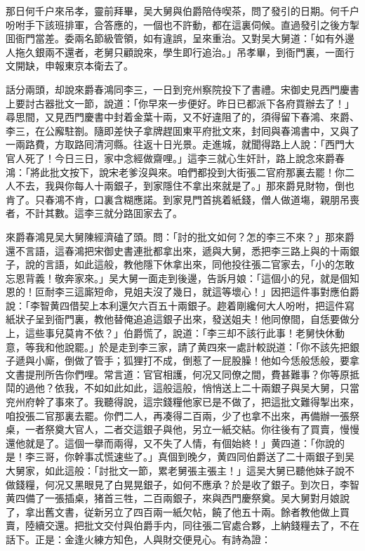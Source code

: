 那日何千户來吊孝，靈前拜畢，吴大舅與伯爵陪侍喫茶，問了發引的日期。何千户吩咐手下該班排軍，合答應的，一個也不許動，都在這裏伺候。直過發引之後方掣囬衙門當差。委兩名節級管領，如有違誤，呈來重治。又對吴大舅道：「如有外邊人拖久銀兩不還者，老舅只顧說來，學生即行追治。」吊孝畢，到衙門裏，一面行文開缺，申報東京本衛去了。

話分兩頭，却說來爵春鴻同李三，一日到兖州察院投下了書禮。宋御史見西門慶書上要討古器批文一節，說道：「你早來一步便好。昨日已都派下各府買辦去了！」尋思間，又見西門慶書中封着金葉十兩，又不好違阻了的，須得留下春鴻、來爵、李三，在公廨駐劄。隨即差快子拿牌趕囬東平府批文來，封囘與春鴻書中，又與了一兩路費，方取路囘清河縣。往返十日光景。走進城，就聞得路上人說：「西門大官人死了！今日三日，家中念經做齋哩。」這李三就心生奸計，路上說念來爵春鴻：「將此批文按下，說宋老爹沒與來。咱們都投到大街張二官府那裏去罷！你二人不去，我與你每人十兩銀子，到家隱住不拿出來就是了。」那來爵見財物，倒也肯了。只春鴻不肯，口裏含糊應諾。到家見門首挑着紙錢，僧人做道塲，親朋吊喪者，不計其數。這李三就分路囬家去了。

來爵春鴻見吴大舅陳經濟磕了頭。問：「討的批文如何？怎的李三不來？」那來爵還不言語，這春鴻把宋御史書連批都拿出來，遞與大舅，悉把李三路上與的十兩銀子，說的言語，如此這般，教他隱下休拿出來，同他投往張二官家去，「小的怎敢忘恩背義！敬奔家來。」吴大舅一面走到後邊，告訴月娘：「這個小的兒，就是個知恩的！叵耐李三這廝短命，見姐夫沒了幾日，就這等壞心！」因把這件事對應伯爵說：「李智黄四借契上本利還欠六百五十兩銀子。趂着剛纔何大人吩咐，把這件寫紙狀子呈到衙門裏，教他替俺追追這銀子出來，發送姐夫！他同僚間，自恁要做分上，這些事兒莫肯不依？」伯爵慌了，說道：「李三却不該行此事！老舅快休動意，等我和他說罷。」於是走到李三家，請了黄四來一處計較説道：「你不該先把銀子遞與小廝，倒做了管手；狐狸打不成，倒惹了一屁股臊！他如今恁般恁般，要拿文書提刑所告你們哩。常言道：官官相護，何况又同僚之間，費甚難事？你等原抵鬦的過他？依我，不如如此如此，這般這般，悄悄送上二十兩銀子與吴大舅，只當兖州府幹了事來了。我聽得說，這宗錢糧他家已是不做了，把這批文難得掣出來，咱投張二官那裏去罷。你們二人，再凑得二百兩，少了也拿不出來，再備辦一張祭桌，一者祭奠大官人，二者交這銀子與他，另立一紙交結。你往後有了買賣，慢慢還他就是了。這個一擧而兩得，又不失了人情，有個始終！」黄四道：「你說的是！李三哥，你幹事忒慌速些了。」真個到晚夕，黄四同伯爵送了二十兩銀子到吴大舅家，如此這般：「討批文一節，累老舅張主張主！」這吴大舅已聽他妹子說不做錢糧，何况又黑眼見了白晃晃銀子，如何不應承？於是收了銀子。到次日，李智黄四備了一張插桌，猪首三牲，二百兩銀子，來與西門慶祭奠。吴大舅對月娘說了，拿出舊文書，従新另立了四百兩一紙欠帖，饒了他五十兩。餘者教他做上買賣，陸續交還。把批文交付與伯爵手内，同往張二官處合夥，上納錢糧去了，不在話下。正是：金逢火練方知色，人與財交便見心。有詩為證：

